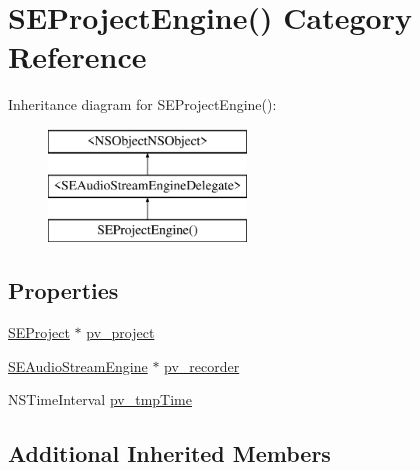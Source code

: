 \hypertarget{category_s_e_project_engine_07_08}{\section{S\-E\-Project\-Engine() Category Reference}
\label{category_s_e_project_engine_07_08}
}
Inheritance diagram for S\-E\-Project\-Engine()\-:\begin{figure}[H]
\begin{center}
\leavevmode
\includegraphics[height=3.000000cm]{category_s_e_project_engine_07_08}
\end{center}
\end{figure}
\subsection*{Properties}
\begin{DoxyCompactItemize}
\item 
\hyperlink{interface_s_e_project}{S\-E\-Project} $\ast$ \hyperlink{category_s_e_project_engine_07_08_a410c495fb2444cb8f4bb502819f2f709}{pv\-\_\-project}
\item 
\hyperlink{interface_s_e_audio_stream_engine}{S\-E\-Audio\-Stream\-Engine} $\ast$ \hyperlink{category_s_e_project_engine_07_08_af934c18203a994d10023f4ba3d694d5c}{pv\-\_\-recorder}
\item 
N\-S\-Time\-Interval \hyperlink{category_s_e_project_engine_07_08_ac43ef0758ea8bd82543c0af72588361f}{pv\-\_\-tmp\-Time}
\end{DoxyCompactItemize}
\subsection*{Additional Inherited Members}


